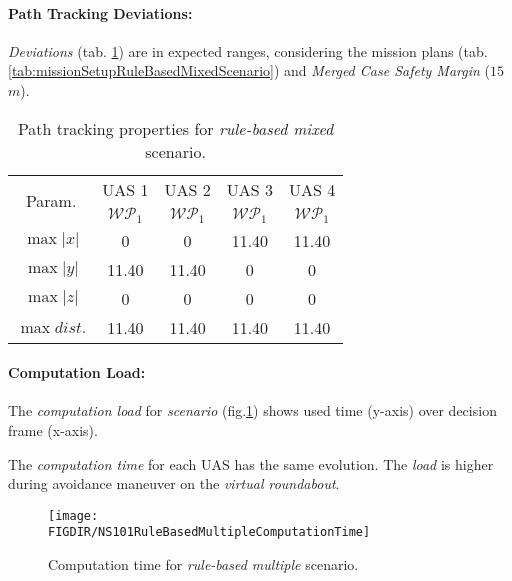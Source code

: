 \newpage
\paragraph{Path Tracking Deviations:} \emph{Deviations} (tab. \ref{tab:pathTrackingParametersForRuleBasedMixed}) are in expected ranges, considering the mission plans (tab. \ref{tab:missionSetupRuleBasedMixedScenario}) and \emph{Merged Case Safety Margin} ($15$ $m$).

\begin{table}[H]
	\centering
	\begin{tabular}{c||c|c|c|c}
		\multirow{2}{*}{Param.} & UAS 1     & UAS 2             & UAS 3             & UAS 4 \\\cline{2-5}
						& $\mathscr{WP}_1$  & $\mathscr{WP}_1$  & $\mathscr{WP}_1$  & $\mathscr{WP}_1$ \\\hline\hline
		  $\max |x|$    & 0                 & 0                 & 11.40             & 11.40\\\hline
		  $\max |y|$    & 11.40             & 11.40             & 0                 & 0\\\hline
		  $\max |z|$    & 0                 & 0                 & 0                 & 0\\\hline
		  $\max dist.$  & 11.40             & 11.40             & 11.40              & 11.40\\
	\end{tabular}
	\caption{Path tracking properties for \emph{rule-based mixed} scenario.}
	\label{tab:pathTrackingParametersForRuleBasedMixed}
\end{table}


\paragraph{Computation Load:} The \emph{computation load} for \emph{scenario} (fig.\ref{fig:ruleBasedMultipleComputationTime}) shows used time (y-axis) over decision frame (x-axis).

The \emph{computation time} for each UAS has the same evolution. The \emph{load} is higher  during avoidance maneuver on the \emph{virtual roundabout}.

\begin{figure}[H]
\centering
\texttt{[image: \\FIGDIR/NS101RuleBasedMultipleComputationTime]} 
\caption{Computation time for \emph{rule-based multiple} scenario.}
\label{fig:ruleBasedMultipleComputationTime}
\end{figure}